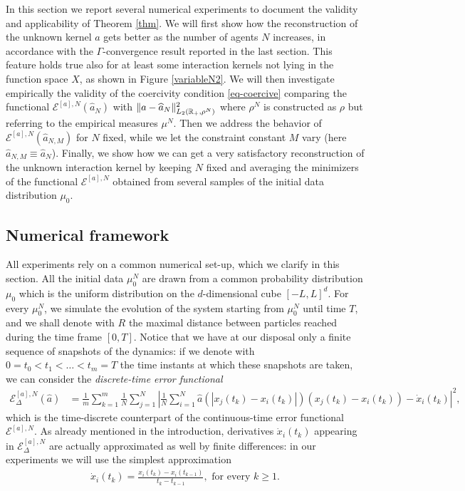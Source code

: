 In this section we report several numerical experiments to document the validity and applicability of Theorem \ref{thm}. We will first show how the reconstruction of the unknown kernel $a$ gets better as the number of agents $N$ increases, in accordance with the $\Gamma$-convergence result reported in the last section. This feature holds true also for at least some interaction kernels not lying in the function space $X$, as shown in Figure \ref{variableN2}. We will then investigate empirically the validity of the coercivity condition \eqref{eq-coercive} comparing the functional $\mathcal E^{[a],N}(\widehat a_N)$ with $\|a - \widehat a_N\|_{L_2(\mathbb{R}_+,\rho^N)}^2$ where $\rho^N$ is constructed as $\rho$ but referring to the empirical measures $\mu^N$. Then we address  the behavior of $\mathcal E^{[a],N}(\widehat a_{N,M})$ for $N$ fixed, while we let the constraint constant  $M$ vary (here $\widehat a_{N,M}\equiv\widehat a_{N}$). Finally, we show how we can get a very satisfactory reconstruction of the unknown interaction kernel by keeping $N$ fixed and averaging the minimizers of the functional $\mathcal E^{[a],N}$ obtained from several samples of the initial data distribution $\mu_0$.

\subsection{Numerical framework}\label{numfram}

All experiments  rely on a common numerical set-up, which we clarify in this section. All the initial data $\mu^N_0$ are drawn from a common probability distribution $\mu_0$ which is the uniform distribution on the $d$-dimensional cube $[-L,L]^d$. For every $\mu^N_0$, we simulate the evolution of the system starting from $\mu^N_0$ until time $T$, and we shall denote with $R$ the maximal distance between particles reached during the time frame $[0,T]$. Notice that we have at our disposal only a finite sequence of snapshots of the dynamics: if we denote with $0 = t_0 < t_1 < \ldots < t_m = T$ the time instants at which these snapshots are taken, we can consider the \textit{discrete-time error functional}
\begin{align*}
\mathcal{E}^{[a],N}_\Delta(\widehat{a}) & = \frac{1}{m} \sum^m_{k = 1} \frac{1}{N} \sum^N_{j = 1} \left| \frac{1}{N} \sum^N_{i = 1} \widehat{a}(|x_j(t_k) - x_i(t_k)|)(x_j(t_k) - x_i(t_k)) - \dot{x}_i(t_k)\right|^2,
\end{align*}
which is the time-discrete counterpart of the continuous-time error functional $\mathcal{E}^{[a],N}$. As already mentioned in the introduction, derivatives $\dot{x}_i(t_k)$ appearing in $\mathcal{E}^{[a],N}_\Delta$ are actually approximated as well by finite differences: in our experiments we will use the simplest approximation
\begin{align*}
\dot{x}_i(t_k) = \frac{x_i(t_k) - x_i(t_{k-1})}{t_k - t_{k-1}}, \text{ for every } k \geq 1.
\end{align*}

